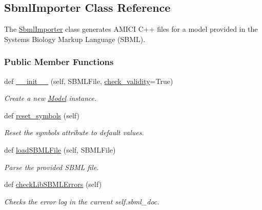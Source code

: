 \hypertarget{classamici_1_1sbml__import_1_1_sbml_importer}{}\subsection{Sbml\+Importer Class Reference}
\label{classamici_1_1sbml__import_1_1_sbml_importer}


The \mbox{\hyperlink{classamici_1_1sbml__import_1_1_sbml_importer}{Sbml\+Importer}} class generates A\+M\+I\+CI C++ files for a model provided in the Systems Biology Markup Language (S\+B\+ML).  


\subsubsection*{Public Member Functions}
\begin{DoxyCompactItemize}
\item 
def \mbox{\hyperlink{classamici_1_1sbml__import_1_1_sbml_importer_a43883fb7d114020827d890422ebd25b0}{\+\_\+\+\_\+init\+\_\+\+\_\+}} (self, S\+B\+M\+L\+File, \mbox{\hyperlink{classamici_1_1sbml__import_1_1_sbml_importer_a0081a154645011de07914e7be47eba32}{check\+\_\+validity}}=True)
\begin{DoxyCompactList}\small\item\em Create a new \mbox{\hyperlink{classamici_1_1_model}{Model}} instance. \end{DoxyCompactList}\item 
def \mbox{\hyperlink{classamici_1_1sbml__import_1_1_sbml_importer_a17147ce5084526fa003563813c1be230}{reset\+\_\+symbols}} (self)
\begin{DoxyCompactList}\small\item\em Reset the symbols attribute to default values. \end{DoxyCompactList}\item 
def \mbox{\hyperlink{classamici_1_1sbml__import_1_1_sbml_importer_a16147666bbc66b3573fd6d49c4023af1}{load\+S\+B\+M\+L\+File}} (self, S\+B\+M\+L\+File)
\begin{DoxyCompactList}\small\item\em Parse the provided S\+B\+ML file. \end{DoxyCompactList}\item 
def \mbox{\hyperlink{classamici_1_1sbml__import_1_1_sbml_importer_a0dcfa882a6a14f2d4b83e11552aae318}{check\+Lib\+S\+B\+M\+L\+Errors}} (self)
\begin{DoxyCompactList}\small\item\em Checks the error log in the current self.\+sbml\+\_\+doc. \end{DoxyCompactList}\item 

\end{DoxyCompactItemize}
